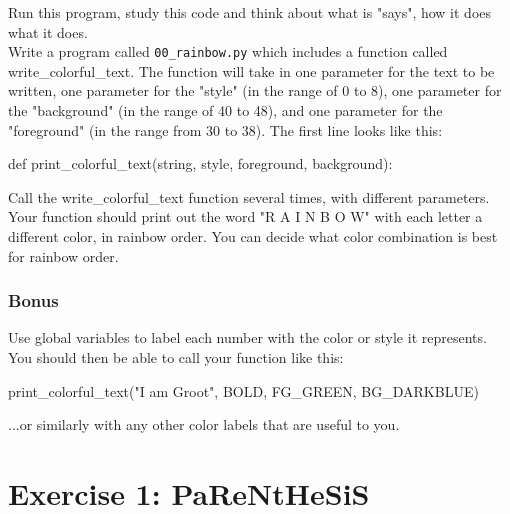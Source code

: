 \documentclass{42-en}
\begin{document}
Run this program, study this code and think about what is "says", how it does what it does.\\

Write a program called \texttt{00\_rainbow.py} which includes a function called write\_colorful\_text. The function will take in one parameter for the text to be written, one parameter for the "style" (in the range of 0 to 8), one parameter for the "background" (in the range of 40 to 48), and one parameter for the "foreground" (in the range from 30 to 38). The first line looks like this:

\begin{42pycode}
def print_colorful_text(string, style, foreground, background):
\end{42pycode}

Call the write\_colorful\_text function several times, with different parameters. Your function should print out the word "R A I N B O W" with each letter a different color, in rainbow order. You can decide what color combination is best for rainbow order.\\

\subsection{Bonus}

Use global variables to label each number with the color or style it represents. You should then be able to call your function like this:
\begin{42pycode}
print_colorful_text("I am Groot", BOLD, FG_GREEN, BG_DARKBLUE)
\end{42pycode}

...or similarly with any other color labels that are useful to you. 


\nextexercice
\newpage


\chapter{Exercise 1: PaReNtHeSiS}
\makeheaderfiles
\end{document}
